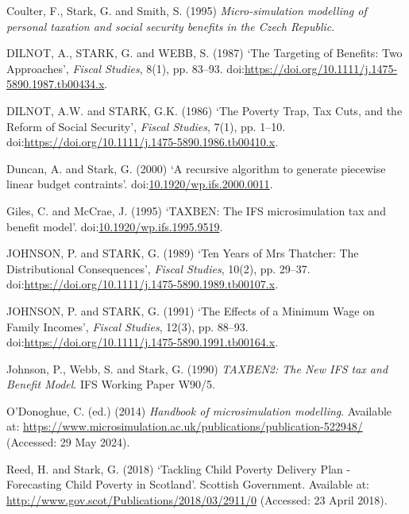 \documentclass[
  letterpaper,
  DIV=11,
  numbers=noendperiod]{scrartcl}
\newlength{\cslhangindent}
\newenvironment{CSLReferences}[2] %
 {\begin{list}{}{%
  \setlength{\itemindent}{0pt}
  \setlength{\leftmargin}{0pt}
  \setlength{\parsep}{0pt}
  \ifodd #1
   \setlength{\leftmargin}{\cslhangindent}
   \setlength{\itemindent}{-1\cslhangindent}
  \fi
  \setlength{\itemsep}{#2\baselineskip}}}
 {\end{list}}
\begin{document}
\label{refs}
\begin{CSLReferences}{0}{1}
Coulter, F., Stark, G. and Smith, S. (1995) \emph{Micro-simulation
modelling of personal taxation and social security benefits in the
{Czech} {Republic}}.

DILNOT, A., STARK, G. and WEBB, S. (1987) {`The {Targeting} of
{Benefits}: {Two} {Approaches}'}, \emph{Fiscal Studies}, 8(1), pp.
83--93. doi:\url{https://doi.org/10.1111/j.1475-5890.1987.tb00434.x}.

DILNOT, A.W. and STARK, G.K. (1986) {`The {Poverty} {Trap}, {Tax}
{Cuts}, and the {Reform} of {Social} {Security}'}, \emph{Fiscal
Studies}, 7(1), pp. 1--10.
doi:\url{https://doi.org/10.1111/j.1475-5890.1986.tb00410.x}.

Duncan, A. and Stark, G. (2000) {`A recursive algorithm to generate
piecewise linear budget contraints'}.
doi:\href{https://doi.org/10.1920/wp.ifs.2000.0011}{10.1920/wp.ifs.2000.0011}.

Giles, C. and McCrae, J. (1995) {`{TAXBEN}: The {IFS} microsimulation
tax and benefit model'}.
doi:\href{https://doi.org/10.1920/wp.ifs.1995.9519}{10.1920/wp.ifs.1995.9519}.

JOHNSON, P. and STARK, G. (1989) {`Ten {Years} of {Mrs} {Thatcher}: The
{Distributional} {Consequences}'}, \emph{Fiscal Studies}, 10(2), pp.
29--37. doi:\url{https://doi.org/10.1111/j.1475-5890.1989.tb00107.x}.

JOHNSON, P. and STARK, G. (1991) {`The {Effects} of a {Minimum} {Wage}
on {Family} {Incomes}'}, \emph{Fiscal Studies}, 12(3), pp. 88--93.
doi:\url{https://doi.org/10.1111/j.1475-5890.1991.tb00164.x}.

Johnson, P., Webb, S. and Stark, G. (1990) \emph{{TAXBEN2}: {The} {New}
{IFS} tax and {Benefit} {Model}}. IFS Working Paper W90/5.

O'Donoghue, C. (ed.) (2014) \emph{Handbook of microsimulation
modelling}. Available at:
\url{https://www.microsimulation.ac.uk/publications/publication-522948/}
(Accessed: 29 May 2024).

Reed, H. and Stark, G. (2018) {`Tackling {Child} {Poverty} {Delivery}
{Plan} - {Forecasting} {Child} {Poverty} in {Scotland}'}. Scottish
Government. Available at:
\url{http://www.gov.scot/Publications/2018/03/2911/0} (Accessed: 23
April 2018).


\end{CSLReferences}
\end{document}
